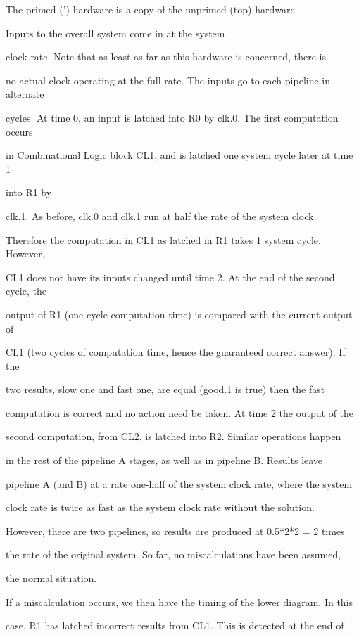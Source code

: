 \documentclass[12pt,dvips]{article}
\begin{document}
The primed (') hardware is a copy of the unprimed (top) hardware.

Inputs to the overall system come in at the system

clock rate. Note that as least as far as this hardware is concerned, there is

no actual clock operating at the full rate. The inputs go to each pipeline in alternate

cycles. At time 0, an input is latched into R0 by clk.0. The first computation occurs

in Combinational Logic block CL1, and is latched one system cycle later at time 1

into R1 by

clk.1. As before, clk.0 and clk.1 run at half the rate of the system clock.

Therefore the computation in CL1 as latched in R1 takes 1 system cycle. However,

CL1 does not have its inputs changed until time 2. At the end of the second cycle, the

output of R1 (one cycle computation time) is compared with the current output of

CL1 (two cycles of computation time, hence the guaranteed correct answer). If the

two results, slow one and fast one, are equal (good.1 is true) then the fast

computation is correct and no action need be taken. At time 2 the output of the

second computation, from CL2, is latched into R2. Similar operations happen

in the rest of the pipeline A stages, as well as in pipeline B. Results leave

pipeline A (and B) at a rate one-half of the system clock rate, where the system

clock rate is twice as fast as the system clock rate without the solution.

However, there are two pipelines, so results are produced at 0.5*2*2 = 2 times

the rate of the original system. So far, no miscalculations have been assumed,

the normal situation.



If a miscalculation occurs, we then have the timing of the lower diagram. In this

case, R1 has latched incorrect results from CL1. This is detected at the end of
\end{document}
